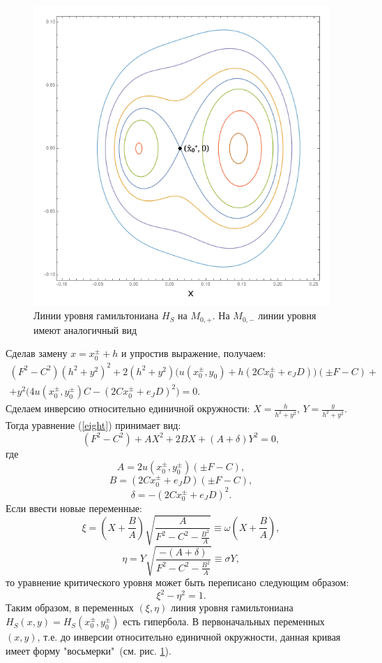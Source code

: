 \begin{figure}[H]
\centering
\includegraphics[scale=0.4]{img/Hlines.png}
\caption{Линии уровня гамильтониана $H_S$ на $M_{0,+}$. На $M_{0,-}$ линии уровня имеют аналогичный вид}
\label{levels_slow}
\end{figure}

Сделав замену $x = x_0^{\pm} + h$ и упростив выражение, получаем:
\begin{multline}
(F^2-C^2)(h^2+y^2)^2+2(h^2+y^2) \big(u(x_0^{\pm}, y_0)+h(2Cx_0^{\pm}+e_JD) \big) (\pm F - C)+\\ 
+ y^2 \big(4u(x_0^{\pm},y_0^{\pm})C-(2Cx_0^{\pm}+e_JD)^2 \big) = 0.
\label{eight}
\end{multline}
Сделаем инверсию относительно единичной окружности: $X=\frac{h}{h^2+y^2}$, $Y=\frac{y}{h^2+y^2}$. Тогда уравнение (\ref{eight}) принимает вид:
$$(F^2-C^2)+AX^2+2BX+(A+\delta)Y^2=0,$$
где
$$A = 2 u(x_0^{\pm}, y_0^{\pm})(\pm F - C),$$
$$B = (2Cx_0^{\pm}+e_J D)(\pm F - C),$$
$$\delta = -(2Cx_0^{\pm}+e_J D)^2.$$
Если ввести новые переменные:
$$\xi  = \left( X+\frac{B}{A} \right) \sqrt{\frac{A}{F^2-C^2-\frac{B^2}{A}}} \equiv \omega \left( X+\frac{B}{A} \right),$$
$$\eta = Y \sqrt{\frac{-(A+\delta)}{F^2-C^2-\frac{B^2}{A}}} \equiv \sigma Y,$$
то уравнение критического уровня может быть переписано следующим образом:
\begin{equation}
\label{hyper}
\xi^2-\eta^2=1.
\end{equation}
Таким образом, в переменных $(\xi, \eta)$ линия уровня гамильтониана $H_S(x,y) = H_S(x_0^{\pm},y_0^{\pm})$ есть гипербола. В первоначальных переменных  $(x, y)$, т.е. до инверсии относительно единичной окружности, данная кривая имеет форму "восьмерки"\, (см. рис. \ref{levels_slow}).

